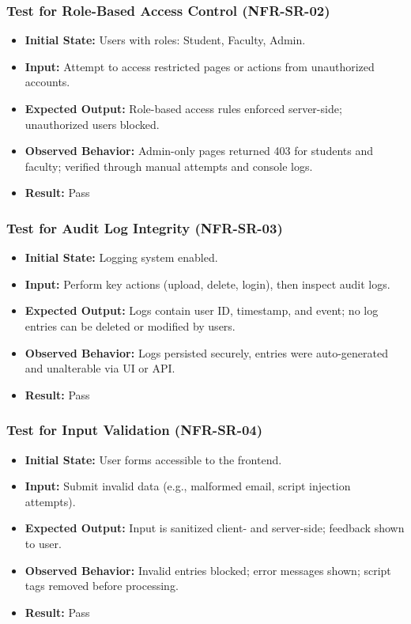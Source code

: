 \documentclass[12pt, titlepage]{article}
\begin{document}
\subsubsection{Test for Role-Based Access Control (NFR-SR-02)}
\begin{itemize}
    \item \textbf{Initial State:} Users with roles: Student, Faculty, Admin.
    \item \textbf{Input:} Attempt to access restricted pages or actions from unauthorized accounts.
    \item \textbf{Expected Output:} Role-based access rules enforced server-side; unauthorized users blocked.
    \item \textbf{Observed Behavior:} Admin-only pages returned 403 for students and faculty; verified through manual attempts and console logs.
    \item \textbf{Result:} Pass
\end{itemize}

\subsubsection{Test for Audit Log Integrity (NFR-SR-03)}
\begin{itemize}
    \item \textbf{Initial State:} Logging system enabled.
    \item \textbf{Input:} Perform key actions (upload, delete, login), then inspect audit logs.
    \item \textbf{Expected Output:} Logs contain user ID, timestamp, and event; no log entries can be deleted or modified by users.
    \item \textbf{Observed Behavior:} Logs persisted securely, entries were auto-generated and unalterable via UI or API.
    \item \textbf{Result:} Pass
\end{itemize}

\subsubsection{Test for Input Validation (NFR-SR-04)}
\begin{itemize}
    \item \textbf{Initial State:} User forms accessible to the frontend.
    \item \textbf{Input:} Submit invalid data (e.g., malformed email, script injection attempts).
    \item \textbf{Expected Output:} Input is sanitized client- and server-side; feedback shown to user.
    \item \textbf{Observed Behavior:} Invalid entries blocked; error messages shown; script tags removed before processing.
    \item \textbf{Result:} Pass
\end{itemize}
\end{document}
